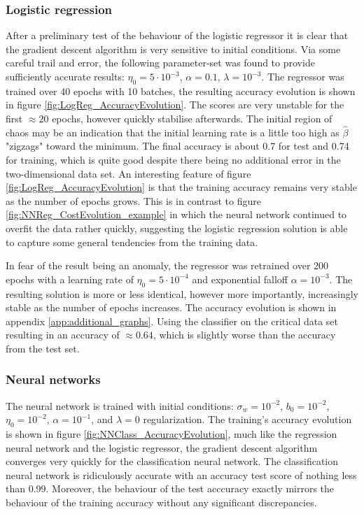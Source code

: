 \documentclass[nofootinbib,reprint,english]{revtex4-1}
\newcommand{\betahat}{\hat{\beta}}
\begin{document}
\subsubsection{Logistic regression}
After a preliminary test of the behaviour of the logistic regressor it is clear that the gradient descent algorithm is very sensitive to initial conditions. Via some careful trail and error, the following parameter-set was found to provide sufficiently accurate results: \(\eta_0=5\cdot10^{-3}\), \(\alpha=0.1\), \(\lambda=10^{-3}\). The regressor was trained over 40 epochs with 10 batches, the resulting accuracy evolution is shown in figure \ref{fig:LogReg_AccuracyEvolution}. The scores are very unstable for the first \(\approx20\) epochs, however quickly stabilise afterwards. The initial region of chaos may be an indication that the initial learning rate is a little too high as \(\betahat\) "zigzags" toward the minimum. The final accuracy is about 0.7 for test and 0.74 for training, which is quite good despite there being no additional error in the two-dimensional data set. An interesting feature of figure \ref{fig:LogReg_AccuracyEvolution} is that the training accuracy remains very stable as the number of epochs grows. This is in contrast to figure \ref{fig:NNReg_CostEvolution_example} in which the neural network continued to overfit the data rather quickly, suggesting the logistic regression solution is able to capture some general tendencies from the training data.

In fear of the result being an anomaly, the regressor was retrained over 200 epochs with a learning rate of \(\eta_0=5\cdot10^{-4}\) and exponential falloff \(\alpha=10^{-3}\). The resulting solution is more or less identical, however more importantly, increasingly stable as the number of epochs increases. The accuracy evolution is shown in appendix \ref{app:additional_graphs}. Using the classifier on the critical data set resulting in an accuracy of \(\approx0.64\), which is slightly worse than the accuracy from the test set.

\subsubsection{Neural networks}
The neural network is trained with initial conditions: \(\sigma_w=10^{-2}\), \(b_0=10^{-2}\), \(\eta_0=10^{-2}\), \(\alpha=10^{-1}\), and \(\lambda=0\) regularization. The training's accuracy evolution is shown in figure \ref{fig:NNClass_AccuracyEvolution}, much like the regression neural network and the logistic regressor, the gradient descent algorithm converges very quickly for the classification neural network. The classification neural network is ridiculously accurate with an accuracy test score of nothing less than 0.99. Moreover, the behaviour of the test acccuracy exactly mirrors the behaviour of the training accuracy without any significant discrepancies. 
\end{document}
